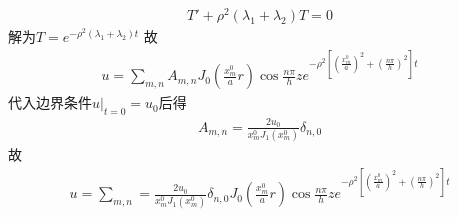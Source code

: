 \documentclass{phyasgn}
\begin{document}
\begin{sol}[2]
\begin{align*}
        T'+\rho^2(\lambda_1+\lambda_2)T=0
    \end{align*}
    解为$T=e^{-\rho^2(\lambda_1+\lambda_2)t}$
    故
    \begin{align}
        u=\sum_{m,n}A_{m,n}J_0(\frac{x_m^0}{a}r)\cos\frac{n\pi}{h}ze^{-\rho^2[(\frac{x_m^0}{a})^2+(\frac{n\pi}{h})^2]t}
    \end{align}
    代入边界条件$u|_{t=0}=u_0$后得
    \begin{align*}
        A_{m,n}=\frac{2u_0}{x_m^0J_1(x_m^0)}\delta_{n,0}
    \end{align*}
    故\begin{align*}
        u=\sum_{m,n}=\frac{2u_0}{x_m^0J_1(x_m^0)}\delta_{n,0}J_0(\frac{x_m^0}{a}r)\cos\frac{n\pi}{h}ze^{-\rho^2[(\frac{x_m^0}{a})^2+(\frac{n\pi}{h})^2]t}
    \end{align*}
\end{sol}\par
\end{document}
